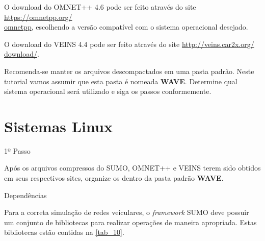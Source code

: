 \documentclass[
12pt,				%
openright,			%
oneside,			%
a4paper,			%
brazil,				%
]{abntex2}
\begin{document}
{\begin{anexosenv}
		    \par O download do OMNET++ 4.6 pode ser feito através do site \href{https://omnetpp.org/omnetpp}{https://omnetpp.org/\\omnetpp}, escolhendo a versão compatível com o sistema operacional desejado. %

		    \par O download do VEINS 4.4 pode ser feito através do site \href{http://veins.car2x.org/download/}{http://veins.car2x.org/\\download/}. %

		    \par Recomenda-se manter os arquivos descompactados em uma pasta padrão. Neste tutorial vamos assumir que esta pasta é nomeada \textbf{WAVE}. Determine qual sistema operacional será utilizado e siga os passos conformemente.

        	\newpage

        	\section{Sistemas Linux}

            	\begin{description}
		            \item[1º Passo]
		        \end{description}
		        \par Após os arquivos compressos do SUMO, OMNET++ e VEINS terem sido obtidos em seus respectivos sites, organize os dentro da pasta padrão \textbf{WAVE}.

            	\begin{description}
            		\item[Dependências]
            	\end{description}            	
                	\par Para a correta simulação de redes veiculares, o \textit{framework} SUMO deve possuir um conjunto de bibliotecas para realizar operações de maneira apropriada. Estas bibliotecas estão contidas na \autoref{tab_10}.


\end{anexosenv}}
\end{document}
